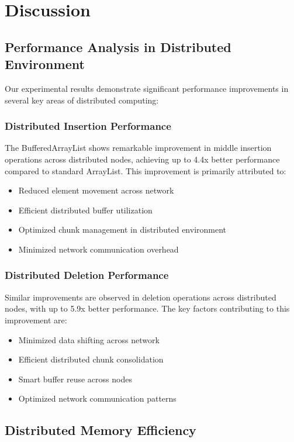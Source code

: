 \section{Discussion}
\label{sec:discussion}

\subsection{Performance Analysis in Distributed Environment}

Our experimental results demonstrate significant performance improvements in several key areas of distributed computing:

\subsubsection{Distributed Insertion Performance}
The BufferedArrayList shows remarkable improvement in middle insertion operations across distributed nodes, achieving up to 4.4x better performance compared to standard ArrayList. This improvement is primarily attributed to:
\begin{itemize}
    \item Reduced element movement across network
    \item Efficient distributed buffer utilization
    \item Optimized chunk management in distributed environment
    \item Minimized network communication overhead
\end{itemize}

\subsubsection{Distributed Deletion Performance}
Similar improvements are observed in deletion operations across distributed nodes, with up to 5.9x better performance. The key factors contributing to this improvement are:
\begin{itemize}
    \item Minimized data shifting across network
    \item Efficient distributed chunk consolidation
    \item Smart buffer reuse across nodes
    \item Optimized network communication patterns
\end{itemize}

\subsection{Distributed Memory Efficiency}


